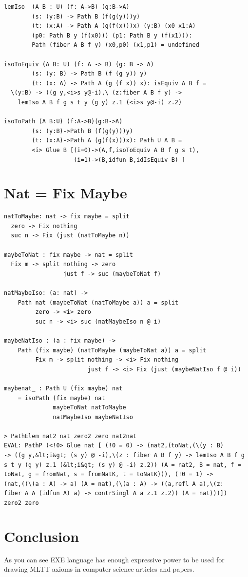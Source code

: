 \documentclass{svproc}
\begin{document}
\begin{lstlisting}[mathescape=true]
lemIso  (A B : U) (f: A->B) (g:B->A)
        (s: (y:B) -> Path B (f(g(y)))y)
        (t: (x:A) -> Path A (g(f(x)))x) (y:B) (x0 x1:A)
        (p0: Path B y (f(x0))) (p1: Path B y (f(x1))):
        Path (fiber A B f y) (x0,p0) (x1,p1) = undefined

isoToEquiv (A B: U) (f: A -> B) (g: B -> A)
        (s: (y: B) -> Path B (f (g y)) y)
        (t: (x: A) -> Path A (g (f x)) x): isEquiv A B f =
  \(y:B) -> ((g y,<i>s y@-i),\ (z:fiber A B f y) ->
    lemIso A B f g s t y (g y) z.1 (<i>s y@-i) z.2)

isoToPath (A B:U) (f:A->B)(g:B->A)
        (s: (y:B)->Path B (f(g(y)))y)
        (t: (x:A)->Path A (g(f(x)))x): Path U A B =
        <i> Glue B [(i=0)->(A,f,isoToEquiv A B f g s t),
                    (i=1)->(B,idfun B,idIsEquiv B) ]
\end{lstlisting}

\newpage
\section{Nat = Fix Maybe}

\begin{lstlisting}[mathescape=true]
natToMaybe: nat -> fix maybe = split
  zero -> Fix nothing
  suc n -> Fix (just (natToMaybe n))

maybeToNat : fix maybe -> nat = split
  Fix m -> split nothing -> zero
                 just f -> suc (maybeToNat f)

natMaybeIso: (a: nat) ->
    Path nat (maybeToNat (natToMaybe a)) a = split
         zero -> <i> zero
         suc n -> <i> suc (natMaybeIso n @ i)

maybeNatIso : (a : fix maybe) ->
    Path (fix maybe) (natToMaybe (maybeToNat a)) a = split
         Fix m -> split nothing -> <i> Fix nothing
                        just f -> <i> Fix (just (maybeNatIso f @ i))

maybenat_ : Path U (fix maybe) nat
    = isoPath (fix maybe) nat
              maybeToNat natToMaybe
              natMaybeIso maybeNatIso

> PathElem nat2 nat zero2 zero nat2nat
EVAL: PathP (<!0> Glue nat [ (!0 = 0) -> (nat2,(toNat,(\(y : B)
-> ((g y,&lt;i&gt; (s y) @ -i),\(z : fiber A B f y) -> lemIso A B f g
s t y (g y) z.1 (&lt;i&gt; (s y) @ -i) z.2)) (A = nat2, B = nat, f =
toNat, g = fromNat, s = fromNatK, t = toNatK))), (!0 = 1) ->
(nat,((\(a : A) -> a) (A = nat),(\(a : A) -> ((a,refl A a),\(z:
fiber A A (idfun A) a) -> contrSingl A a z.1 z.2)) (A = nat)))])
zero2 zero
\end{lstlisting}

\section{Conclusion}
As you can see EXE language has enough expressive power to be used for
drawing MLTT axioms in computer science articles and papers.

\newpage



\end{document}
